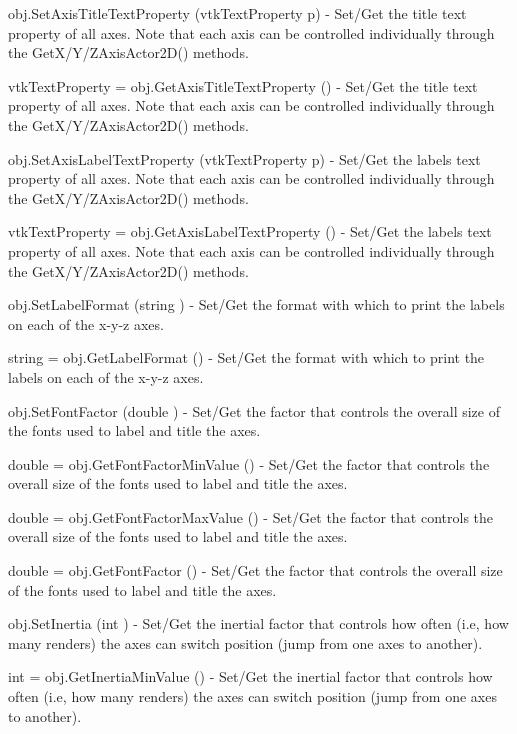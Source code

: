 \begin{DoxyItemize}
\item {\ttfamily obj.\-Set\-Axis\-Title\-Text\-Property (vtk\-Text\-Property p)} -\/ Set/\-Get the title text property of all axes. Note that each axis can be controlled individually through the Get\-X/\-Y/\-Z\-Axis\-Actor2\-D() methods.  
\item {\ttfamily vtk\-Text\-Property = obj.\-Get\-Axis\-Title\-Text\-Property ()} -\/ Set/\-Get the title text property of all axes. Note that each axis can be controlled individually through the Get\-X/\-Y/\-Z\-Axis\-Actor2\-D() methods.  
\item {\ttfamily obj.\-Set\-Axis\-Label\-Text\-Property (vtk\-Text\-Property p)} -\/ Set/\-Get the labels text property of all axes. Note that each axis can be controlled individually through the Get\-X/\-Y/\-Z\-Axis\-Actor2\-D() methods.  
\item {\ttfamily vtk\-Text\-Property = obj.\-Get\-Axis\-Label\-Text\-Property ()} -\/ Set/\-Get the labels text property of all axes. Note that each axis can be controlled individually through the Get\-X/\-Y/\-Z\-Axis\-Actor2\-D() methods.  
\item {\ttfamily obj.\-Set\-Label\-Format (string )} -\/ Set/\-Get the format with which to print the labels on each of the x-\/y-\/z axes.  
\item {\ttfamily string = obj.\-Get\-Label\-Format ()} -\/ Set/\-Get the format with which to print the labels on each of the x-\/y-\/z axes.  
\item {\ttfamily obj.\-Set\-Font\-Factor (double )} -\/ Set/\-Get the factor that controls the overall size of the fonts used to label and title the axes.  
\item {\ttfamily double = obj.\-Get\-Font\-Factor\-Min\-Value ()} -\/ Set/\-Get the factor that controls the overall size of the fonts used to label and title the axes.  
\item {\ttfamily double = obj.\-Get\-Font\-Factor\-Max\-Value ()} -\/ Set/\-Get the factor that controls the overall size of the fonts used to label and title the axes.  
\item {\ttfamily double = obj.\-Get\-Font\-Factor ()} -\/ Set/\-Get the factor that controls the overall size of the fonts used to label and title the axes.  
\item {\ttfamily obj.\-Set\-Inertia (int )} -\/ Set/\-Get the inertial factor that controls how often (i.\-e, how many renders) the axes can switch position (jump from one axes to another).  
\item {\ttfamily int = obj.\-Get\-Inertia\-Min\-Value ()} -\/ Set/\-Get the inertial factor that controls how often (i.\-e, how many renders) the axes can switch position (jump from one axes to another).  

\end{DoxyItemize}
